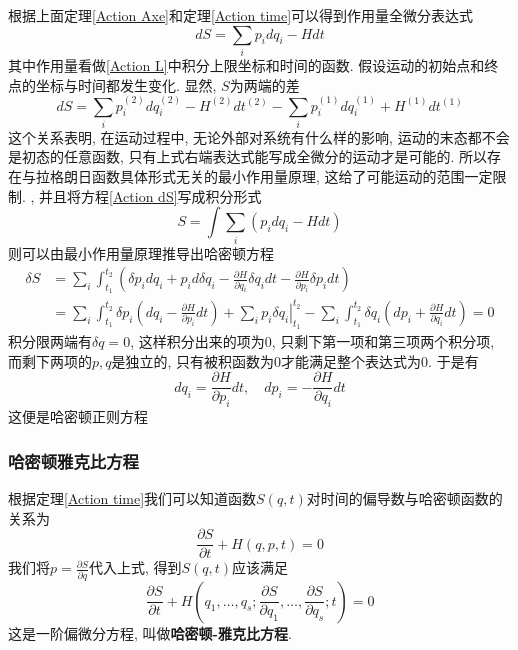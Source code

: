 \documentclass[a4paper,11pt]{book}
\begin{document}
根据上面定理\ref{Action Axe}和定理\ref{Action time}可以得到作用量全微分表达式
\begin{equation}\label{Action dS}
  dS=\sum_{i}p_idq_i-Hdt
\end{equation}
其中作用量看做\eqref{Action L}中积分上限坐标和时间的函数. 假设运动的初始点和终点的坐标与时间都发生变化. 显然, $S$为两端的差
\begin{equation*}
  dS=\sum_{i}p_i^{(2)}dq_i^{(2)}-H^{(2)}dt^{(2)}-\sum_{i}p_i^{(1)}dq_i^{(1)}+H^{(1)}dt^{(1)}
\end{equation*}
这个关系表明, 在运动过程中, 无论外部对系统有什么样的影响, 运动的末态都不会是初态的任意函数, 只有上式右端表达式能写成全微分的运动才是可能的. 所以存在与拉格朗日函数具体形式无关的最小作用量原理, 这给了可能运动的范围一定限制.
, 并且将方程\eqref{Action dS}写成积分形式
\begin{equation}\label{Action int}
  S=\int\sum_{i}\left(p_idq_i-Hdt\right)
\end{equation}
则可以由最小作用量原理推导出哈密顿方程
\begin{equation*}
\begin{split}
   \delta S&=\sum_{i}\int_{t_1}^{t_2}\left(\delta p_idq_i+p_id\delta q_i-\frac{\partial H}{\partial{q_i}}\delta q_idt-\frac{\partial H}{\partial p_i}\delta p_idt\right) \\
     &=\sum_{i}\int_{t_1}^{t_2}\delta p_i\left(dq_i-\frac{\partial H}{\partial{p_i}}dt\right)+\left.\sum_{i}p_i\delta q_i\right|_{t_1}^{t_2}-\sum_{i}\int_{t_1}^{t_2}\delta q_i\left(dp_i+\frac{\partial H}{\partial{q_i}}dt\right)=0
\end{split}
\end{equation*}
积分限两端有$\delta q=0$, 这样积分出来的项为$0$, 只剩下第一项和第三项两个积分项, 而剩下两项的$p,q$是独立的, 只有被积函数为$0$才能满足整个表达式为$0$. 于是有
\begin{equation*}
  dq_i=\frac{\partial H}{\partial{p_i}}dt,\quad dp_i=-\frac{\partial H}{\partial{q_i}}dt
\end{equation*}
这便是哈密顿正则方程
\subsubsection*{哈密顿雅克比方程}
根据定理\ref{Action time}我们可以知道函数$S(q,t)$对时间的偏导数与哈密顿函数的关系为
\begin{equation*}
  \frac{\partial S}{\partial t}+H(q,p,t)=0
\end{equation*}
我们将$p=\frac{\partial S}{\partial q}$代入上式, 得到$S(q,t)$应该满足
\begin{equation*}
  \frac{\partial S}{\partial t}+H(q_1,\dots,q_s;\frac{\partial S}{\partial{q_1}},\dots,\frac{\partial S}{\partial{q_s}};t)=0
\end{equation*}
这是一阶偏微分方程, 叫做\textbf{哈密顿-雅克比方程}.
\end{document}
